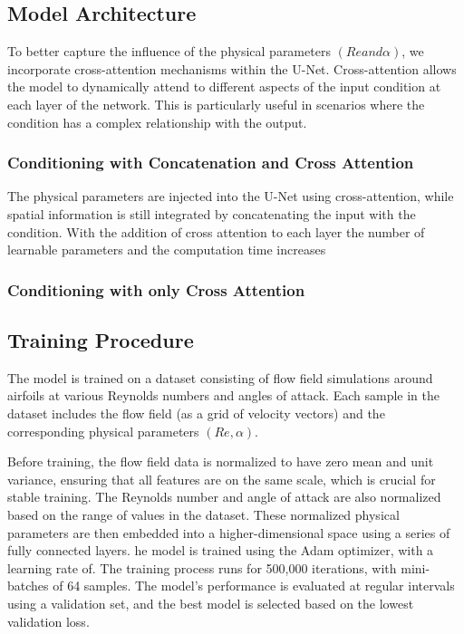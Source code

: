 \documentclass{CUP-JNL-DTM}%
\theoremstyle{definition}
\numberwithin{equation}{section}
\begin{document}
\subsection{Model Architecture}
To better capture the influence of the physical parameters $(Re and \alpha)$, we incorporate cross-attention mechanisms within the U-Net. Cross-attention allows the model to dynamically attend to different aspects of the input condition at each layer of the network. This is particularly useful in scenarios where the condition has a complex relationship with the output.

\subsubsection{Conditioning with Concatenation and Cross Attention}
The physical parameters are injected into the U-Net using cross-attention, while spatial information is still integrated by concatenating the input with the condition. With the addition of cross attention to each layer the number of learnable parameters and the computation time increases 


\subsubsection{Conditioning with only Cross Attention}



\subsection{Training Procedure}
The model is trained on a dataset consisting of flow field simulations around airfoils at various Reynolds numbers and angles of attack. Each sample in the dataset includes the flow field (as a grid of velocity vectors) and the corresponding physical parameters $(Re, \alpha)$.

Before training, the flow field data is normalized to have zero mean and unit variance, ensuring that all features are on the same scale, which is crucial for stable training. The Reynolds number and angle of attack are also normalized based on the range of values in the dataset. These normalized physical parameters are then embedded into a higher-dimensional space using a series of fully connected layers.
he model is trained using the Adam optimizer, with a learning rate of. The training process runs for 500,000 iterations, with mini-batches of 64 samples. The model's performance is evaluated at regular intervals using a validation set, and the best model is selected based on the lowest validation loss.
\end{document}
